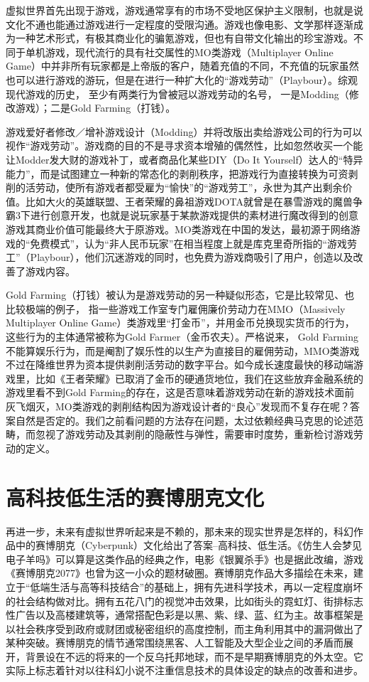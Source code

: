 \documentclass{ctexart}
\begin{document}
虚拟世界首先出现于游戏，游戏通常享有的市场不受地区保护主义限制，也就是说文化不通也能通过游戏进行一定程度的受限沟通。游戏也像电影、文学那样逐渐成为一种艺术形式，有极其商业化的骗氪游戏，但也有自带文化输出的珍宝游戏。不同于单机游戏，现代流行的具有社交属性的MO类游戏（Multiplayer Online Game）中并非所有玩家都是上帝版的客户，随着充值的不同，不充值的玩家虽然也可以进行游戏的游玩，但是在进行一种扩大化的“游戏劳动”（Playbour）。综观现代游戏的历史， 至少有两类行为曾被冠以游戏劳动的名号， 一是Modding（修改游戏）；二是Gold Farming（打钱）。

游戏爱好者修改／增补游戏设计（Modding）并将改版出卖给游戏公司的行为可以视作“游戏劳动”。游戏商的目的不是寻求资本增殖的偶然性，比如忽然收买一个能让Modder发大财的游戏补丁，或者商品化某些DIY（Do It Yourself）达人的“特异能力”，而是试图建立一种新的常态化的剥削秩序，把游戏行为直接转换为可资剥削的活劳动，使所有游戏者都受雇为“愉快”的“游戏劳工”，永世为其产出剩余价值。比如大火的英雄联盟、王者荣耀的鼻祖游戏DOTA就曾是在暴雪游戏的魔兽争霸3下进行创意开发，也就是说玩家基于某款游戏提供的素材进行魔改得到的创意游戏其商业价值可能最终大于原游戏。MO类游戏在中国的发达，最初源于网络游戏的“免费模式”，认为“非人民币玩家”在相当程度上就是库克里奇所指的“游戏劳工”（Playbour），他们沉迷游戏的同时，也免费为游戏商吸引了用户，创造以及改善了游戏内容。

Gold Farming（打钱）被认为是游戏劳动的另一种疑似形态，它是比较常见、也比较极端的例子， 指一些游戏工作室专门雇佣廉价劳动力在MMO（Massively Multiplayer Online Game）类游戏里“打金币”，并用金币兑换现实货币的行为，这些行为的主体通常被称为Gold Farmer（金币农夫）。严格说来， Gold Farming不能算娱乐行为，而是阉割了娱乐性的以生产为直接目的雇佣劳动，MMO类游戏不过在降维世界为资本提供剥削活劳动的数字平台。如今成长速度最快的移动端游戏里，比如《王者荣耀》已取消了金币的硬通货地位，我们在这些放弃金融系统的游戏里看不到Gold Farming的存在，这是否意味着游戏劳动在新的游戏技术面前灰飞烟灭，MO类游戏的剥削结构因为游戏设计者的“良心”发现而不复存在呢？答案自然是否定的。我们之前看问题的方法存在问题，太过依赖经典马克思的论述范畴，而忽视了游戏劳动及其剥削的隐蔽性与弹性，需要审时度势，重新检讨游戏劳动的定义。

\section{高科技低生活的赛博朋克文化}

再进一步，未来有虚拟世界听起来是不赖的，那未来的现实世界是怎样的，科幻作品中的赛博朋克（Cyberpunk）文化给出了答案--高科技、低生活。《仿生人会梦见电子羊吗》可以算是这类作品的经典之作，电影《银翼杀手》也是据此改编，游戏《赛博朋克2077》也曾为这一小众的题材破圈。赛博朋克作品大多描绘在未来，建立于“低端生活与高等科技结合”的基础上，拥有先进科学技术，再以一定程度崩坏的社会结构做对比。拥有五花八门的视觉冲击效果，比如街头的霓虹灯、街排标志性广告以及高楼建筑等，通常搭配色彩是以黑、紫、绿、蓝、红为主。故事框架是以社会秩序受到政府或财团或秘密组织的高度控制，而主角利用其中的漏洞做出了某种突破。赛博朋克的情节通常围绕黑客、人工智能及大型企业之间的矛盾而展开，背景设在不远的将来的一个反乌托邦地球，而不是早期赛博朋克的外太空。它实际上标志着针对以往科幻小说不注重信息技术的具体设定的缺点的改善和进步。
\end{document}
